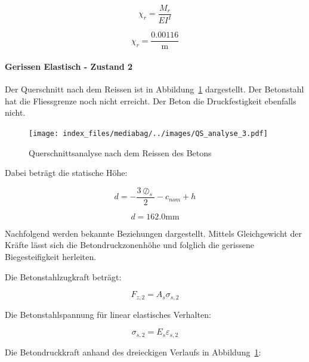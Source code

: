 \documentclass[
  12pt,
  letterpaper,
  egregdoesnotlikesansseriftitles]{scrreprt}
\let\oldparagraph\paragraph
\renewcommand{\paragraph}[1]{\oldparagraph{#1}\mbox{}}
\begin{document}
\begin{equation}\chi_{r} = \frac{M_{r}}{EI^{I}}\end{equation}

\begin{equation}\chi_{r} = \frac{0.00116}{\text{m}}\end{equation}

\hypertarget{gerissen-elastisch---zustand-2}{%
\paragraph{Gerissen Elastisch - Zustand
2}\label{gerissen-elastisch---zustand-2}}

Der Querschnitt nach dem Reissen ist in Abbildung~\ref{fig-qs3}
dargestellt. Der Betonstahl hat die Fliessgrenze noch nicht erreicht.
Der Beton die Druckfestigkeit ebenfalls nicht.

\begin{figure}[H]

{\centering \texttt{[image: index\_files/mediabag/../images/QS\_analyse\_3.pdf]}

}

\caption{\label{fig-qs3}Querschnittsanalyse nach dem Reissen des Betons}

\end{figure}

Dabei beträgt die statische Höhe:

\begin{equation}d = - \frac{3 \oslash_{s}}{2} - c_{nom} + h\end{equation}

\begin{equation}d = 162.0 \text{mm}\end{equation}

Nachfolgend werden bekannte Beziehungen dargestellt. Mittels
Gleichgewicht der Kräfte lässt sich die Betondruckzonenhöhe und folglich
die gerissene Biegesteifigkeit herleiten.

Die Betonstahlzugkraft beträgt:

\begin{equation}F_{z,2} = A_{s} \sigma_{s,2}\end{equation}

Die Betonstahlspannung für linear elastisches Verhalten:

\begin{equation}\sigma_{s,2} = E_{s} \varepsilon_{s,2}\end{equation}

Die Betondruckkraft anhand des dreieckigen Verlaufs in
Abbildung~\ref{fig-qs3}:
\end{document}
